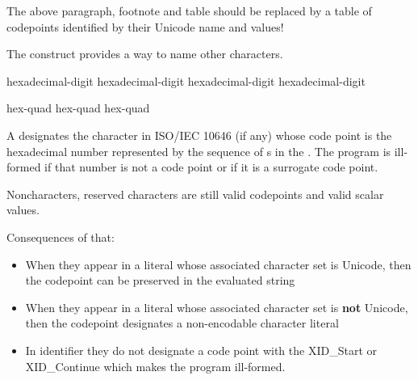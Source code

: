 \documentclass{wg21}
\begin{document}
\begin{quoteblock}
The above paragraph, footnote and table should be replaced by a table of codepoints identified by their Unicode name and values!
\end{quoteblock}

\pnum
The  construct provides a way to name
other characters.

\begin{bnf}
    \br
    hexadecimal-digit hexadecimal-digit hexadecimal-digit hexadecimal-digit
\end{bnf}

\begin{bnf}
    \br
     hex-quad\br
     hex-quad hex-quad
\end{bnf}

A 
designates the character in ISO/IEC 10646 (if any)
whose code point is the hexadecimal number represented by
the sequence of s
in the .
The program is ill-formed if that number is not a code point
or if it is a surrogate code point.

\begin{quoteblock}
Noncharacters, reserved characters
are still valid codepoints and valid scalar values.

Consequences of that:
\begin{itemize}
\item When they appear in a literal whose associated character set is Unicode, then the codepoint can be preserved in the evaluated string
\item When they appear in a literal whose associated character set is \textbf{not} Unicode, then the codepoint designates a non-encodable character literal
\item In identifier they do not designate a code point with the XID_Start or XID_Continue which makes the program ill-formed.
\end{itemize}

\end{quoteblock}
\end{document}
